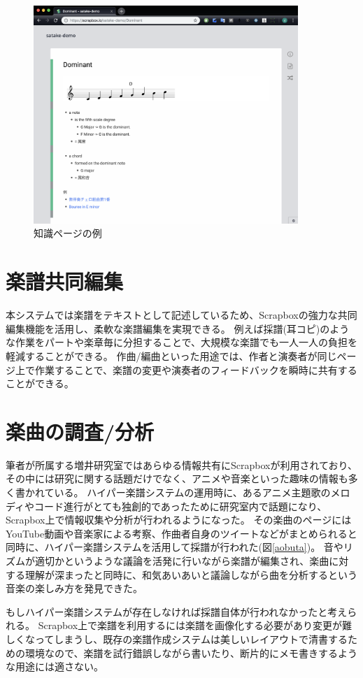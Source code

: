 \begin{figure}[H]
\centering
\includegraphics[width=10cm]{images/dominant.png}
\caption{知識ページの例}
\label{dominant}
\end{figure}

\section{楽譜共同編集}
本システムでは楽譜をテキストとして記述しているため、Scrapboxの強力な共同編集機能を活用し、柔軟な楽譜編集を実現できる。
例えば採譜(耳コピ)のような作業をパートや楽章毎に分担することで、大規模な楽譜でも一人一人の負担を軽減することができる。
作曲/編曲といった用途では、作者と演奏者が同じページ上で作業することで、楽譜の変更や演奏者のフィードバックを瞬時に共有することができる。

\section{楽曲の調査/分析}
筆者が所属する増井研究室ではあらゆる情報共有にScrapboxが利用されており、その中には研究に関する話題だけでなく、アニメや音楽といった趣味の情報も多く書かれている。
ハイパー楽譜システムの運用時に、あるアニメ主題歌のメロディやコード進行がとても独創的であったために研究室内で話題になり、Scrapbox上で情報収集や分析が行われるようになった。
その楽曲のページにはYouTube動画や音楽家による考察、作曲者自身のツイートなどがまとめられると同時に、ハイパー楽譜システムを活用して採譜が行われた(図\ref{aobuta})。
音やリズムが適切かというような議論を活発に行いながら楽譜が編集され、楽曲に対する理解が深まったと同時に、和気あいあいと議論しながら曲を分析するという音楽の楽しみ方を発見できた。

もしハイパー楽譜システムが存在しなければ採譜自体が行われなかったと考えられる。
Scrapbox上で楽譜を利用するには楽譜を画像化する必要があり変更が難しくなってしまうし、既存の楽譜作成システムは美しいレイアウトで清書するための環境なので、楽譜を試行錯誤しながら書いたり、断片的にメモ書きするような用途には適さない。

